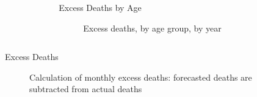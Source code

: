 \documentclass[final]{beamer}
\newlength{\sepwid}
\newlength{\onecolwid}
\newlength{\twocolwid}
\begin{document}
\begin{frame}[t]
\begin{columns}[t]
\begin{column}{\twocolwid}
\begin{columns}[t,totalwidth=\twocolwid]
\begin{column}{\onecolwid}
\end{column} %

\begin{column}{\onecolwid}\vspace{-.6in} %

\begin{block}{Excess Deaths by Age}
\begin{figure}
\caption{Excess deaths, by age group, by year}
\end{figure}
\end{block}

\end{column} %

\end{columns} %



\begin{alertblock}{Excess Deaths}

\begin{figure}
\caption{Calculation of monthly excess deaths: forecasted deaths are subtracted from actual deaths}
\end{figure}

\end{alertblock} 

\end{column} %

\begin{column}{\sepwid}\end{column} %

\begin{column}{\onecolwid} %


\end{column}
\end{columns}
\end{frame}
\end{document}
